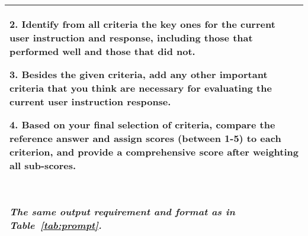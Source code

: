 \begin{table*}[tbh!]
\begin{tabularx}{\textwidth}{X}
        2. Identify from all criteria the key ones for the current user instruction and response, including those that performed well and those that did not. 
        
        3. Besides the given criteria, add any other important criteria that you think are necessary for evaluating the current user instruction response. 
        
        4. Based on your final selection of criteria, \textbf{compare the reference answer and} assign scores (between 1-5) to each criterion, and provide a comprehensive score after weighting all sub-scores. 

        \ 
        
        \emph{The same output requirement and format as in Table~\ref{tab:prompt}.}  \\
    \bottomrule
  \end{tabularx}
\end{table*}







